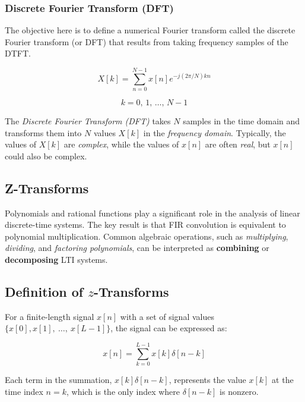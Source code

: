 \documentclass[11pt]{article}
\begin{document}
\subsubsection{Discrete Fourier Transform (DFT)}

The objective here is to define a numerical Fourier transform called the
discrete Fourier transform (or DFT) that results from taking frequency samples
of the DTFT.

\begin{equation}
  X[k] = \sum_{n=0}^{N - 1} x[n] e^{-j(2\pi / N)kn}
\end{equation}

\begin{equation}
  k = 0,\, 1,\, \dots,\, N - 1
\end{equation}

The \emph{Discrete Fourier Transform (DFT)} takes $N$ samples in the time domain
and transforms them into $N$ values $X[k]$ in the \emph{frequency domain}.
Typically, the values of $X[k]$ are \emph{complex}, while the values of $x[n]$
are often \emph{real}, but $x[n]$ could also be complex.

\subsection{Z-Transforms}

Polynomials and rational functions play a significant role in the analysis of
linear discrete-time systems. The key result is that FIR convolution is
equivalent to polynomial multiplication. Common algebraic operations, such as
\emph{multiplying}, \emph{dividing}, and \emph{factoring polynomials}, can be
interpreted as \textbf{combining} or \textbf{decomposing} LTI systems.

\subsection{Definition of $z$-Transforms}

For a finite-length signal $x[n]$ with a set of signal values
$\{x[0], x[1],\ \dots,\ x[L - 1]\}$, the signal can be expressed as:

\begin{equation}
  x[n] = \sum_{k = 0}^{L - 1} x[k] \delta[n - k]
\end{equation}

Each term in the summation, $x[k] \delta[n - k]$, represents the value $x[k]$ at
the time index $n = k$, which is the only index where $\delta[n - k]$ is
nonzero.
\end{document}
